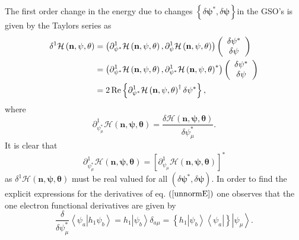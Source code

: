 \documentclass[aps,preprint]{revtex4}%
\begin{document}
The first order change in the energy due to changes $\left\{  \delta
\mathbf{\psi}^{\ast},\delta\mathbf{\psi}\right\}  $in the GSO's is given by
the Taylors series as
\begin{align}
\delta^{1}\mathcal{H}\left(  \mathbf{n},\mathbf{\psi},\mathbf{\theta}\right)
&  =\left(  \partial_{\mathbf{\psi}^{\ast}}^{1}\mathcal{H}\left(
\mathbf{n},\mathbf{\psi},\mathbf{\theta}\right)  ,\partial_{\mathbf{\psi}}%
^{1}\mathcal{H}\left(  \mathbf{n},\mathbf{\psi},\mathbf{\theta}\right)
\right)  \left(
\begin{array}
[c]{c}%
\delta\mathbf{\psi}^{\ast}\\
\delta\mathbf{\psi}%
\end{array}
\right) \nonumber\\
&  =\left(  \partial_{\mathbf{\psi}^{\ast}}^{1}\mathcal{H}\left(
\mathbf{n},\mathbf{\psi},\mathbf{\theta}\right)  ,\partial_{\mathbf{\psi
}^{\ast}}^{1}\mathcal{H}\left(  \mathbf{n},\mathbf{\psi},\mathbf{\theta
}\right)  ^{\ast}\right)  \left(
\begin{array}
[c]{c}%
\delta\mathbf{\psi}^{\ast}\\
\delta\mathbf{\psi}%
\end{array}
\right) \nonumber\\
&  =2\operatorname{Re}\left\{  \partial_{\mathbf{\psi}^{\ast}}^{1}%
\mathcal{H}\left(  \mathbf{n},\mathbf{\psi},\mathbf{\theta}\right)  ^{\dagger
}\delta\mathbf{\psi}^{\ast}\right\}  ,
\end{align}
where
\begin{equation}
\partial_{\psi_{\mu}^{\ast}}^{1}\mathcal{H}\left(  \mathbf{n},\mathbf{\psi
},\mathbf{\theta}\right)  =\frac{\delta\mathcal{H}\left(  \mathbf{n}%
,\mathbf{\psi},\mathbf{\theta}\right)  }{\delta\psi_{\mu}^{\ast}}.
\end{equation}
It is clear that
\begin{equation}
\partial_{\psi_{\mu}^{\ast}}^{1}\mathcal{H}\left(  \mathbf{n},\mathbf{\psi
},\mathbf{\theta}\right)  =\left[  \partial_{\psi_{\mu}}^{1}\mathcal{H}\left(
\mathbf{n},\mathbf{\psi},\mathbf{\theta}\right)  \right]  ^{\ast}%
\end{equation}
as $\delta^{1}\mathcal{H}\left(  \mathbf{n},\mathbf{\psi},\mathbf{\theta
}\right)  $ must be real valued for all $\left(  \delta\mathbf{\psi}^{\ast
},\delta\mathbf{\psi}\right)  $. In order to find the explicit expressions for
the derivatives of eq. $\left(  \ref{unnormE}\right)  $ one observes that the
one electron functional derivatives are given by
\begin{equation}
\frac{\delta}{\delta\psi_{\mu}^{\ast}}\left\langle \left.  \psi_{a}\right\vert
h_{1}\psi_{b}\right\rangle =h_{1}\left\vert \psi_{b}\right\rangle \delta
_{a\mu}=\left\{  h_{1}\left\vert \psi_{b}\right\rangle \left\langle \psi
_{a}\right\vert \right\}  \left\vert \psi_{\mu}\right\rangle .
\label{1partfuncder_o}%
\end{equation}
\end{document}
